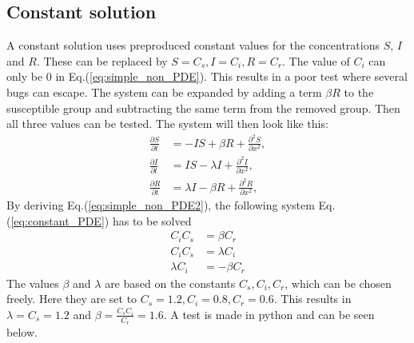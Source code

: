 \documentclass[%
twoside,                 %
final,                   %
chapterprefix=true,      %
open=right               %
10pt]{book}
\begin{document}
\subsection{Constant solution}
A constant solution uses preproduced constant values for the concentrations $S$, $I$ and $R$. These can be replaced by $S = C_s,I=C_i,R=C_r$. The value of $C_i$ can only be 0 in Eq.(\ref{eq:simple_non_PDE}). This results in a poor test where several bugs can escape. The system can be expanded by adding a term $\beta R$ to the susceptible group and subtracting the same term from the removed group. Then all three values can be tested. The system will then look like this: 
\begin{equation} \label{eq:simple_non_PDE2}
	\begin{aligned}
	\frac{\partial S}{\partial t} &= -IS + \beta R + \frac{\partial^2 S}{\partial x^2},\\
	\frac{\partial I}{\partial t} &= IS- \lambda I + \frac{\partial^2 I}{\partial x^2},\\
	\frac{\partial R}{\partial t} &= \lambda I - \beta R + \frac{\partial^2 R}{\partial x^2},
	\end{aligned}
\end{equation}
By deriving Eq.(\ref{eq:simple_non_PDE2}), the following system Eq.(\ref{eq:constant_PDE}) has to be solved
\begin{equation} \label{eq:constant_PDE}
	\begin{aligned}
	C_iC_s &= \beta C_r \\
	C_iC_s &= \lambda C_i \\
	\lambda C_i &= -\beta C_r 
	\end{aligned}
\end{equation}
The values $\beta$ and $\lambda$ are based on the constants $C_s,C_i,C_r$, which can be chosen freely. Here they are set to $C_s = 1.2,C_i=0.8,C_r=0.6$. This results in $\lambda= C_s = 1.2$ and $\beta= \frac{C_s C_i}{C_r}=1.6$. A test is made in python and can be seen below.
\end{document}
